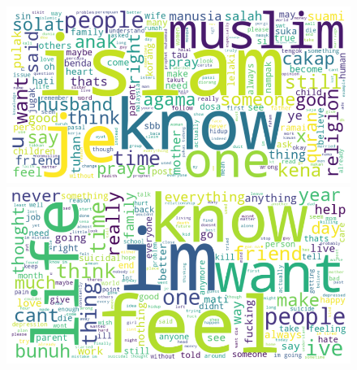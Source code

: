 \documentclass[preprint]{article}
\begin{document}
\begin{figure}[h]
\centering
\begin{minipage}[b]{0.45\textwidth}
\centering
\includegraphics[width=\linewidth]{img/religion-wordcloud.png}
\end{minipage}
\hfill
\begin{minipage}[b]{0.45\textwidth}
\centering
\includegraphics[width=\linewidth]{img/selfharm-worcloud.png}
\end{minipage}
\end{figure}
\end{document}
